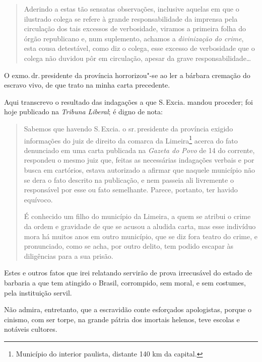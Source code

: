 \begin{quote}
Aderindo a estas tão sensatas observações, inclusive aquelas em que o
ilustrado colega se refere à grande responsabilidade da imprensa pela
circulação dos tais excessos de verbosidade, viramos a primeira folha do
órgão republicano e, num suplemento, achamos a \emph{divinização do
crime}, esta cousa detestável, como diz o colega, esse excesso de
verbosidade que o colega não duvidou pôr em circulação, apesar da grave
responsabilidade\ldots{}
\end{quote}

O exmo.\,dr.\,presidente da província horrorizou"-se ao ler a bárbara
cremação do escravo vivo, de que trato na minha carta precedente.

Aqui transcrevo o resultado das indagações a que S.\,Excia. mandou
proceder; foi hoje publicado na \emph{Tribuna} \emph{Liberal}; é digno
de nota:

\begin{quote}
Sabemos que havendo S.\,Excia. o sr.\,presidente da província exigido
informações do juiz de direito da comarca da Limeira\footnote{
  Município do interior paulista, distante 140 km da capital.} acerca do
fato denunciado em uma carta publicada na \emph{Gazeta do Povo} de 14 do
corrente, respondeu o mesmo juiz que, feitas as necessárias indagações
verbais e por busca em cartórios, estava autorizado a afirmar que
naquele município não se dera o fato descrito na publicação, e nem
passeia ali livremente o responsável por esse ou fato semelhante.
Parece, portanto, ter havido equívoco.

É conhecido um filho do município da Limeira, a quem se atribui o crime
da ordem e gravidade de que se acusou a aludida carta, mas esse
indivíduo mora há muitos anos em outro município, que se diz fora teatro
do crime, e pronunciado, como se acha, por outro delito, tem podido
escapar às diligências para a sua prisão.
\end{quote}

Estes e outros fatos que irei relatando servirão de prova irrecusável do
estado de barbaria a que tem atingido o Brasil, corrompido, sem moral, e
sem costumes, pela instituição servil.

Não admira, entretanto, que a escravidão conte esforçados apologistas,
porque o cinismo, com ser torpe, na grande pátria dos imortais helenos,
teve escolas e notáveis cultores.

